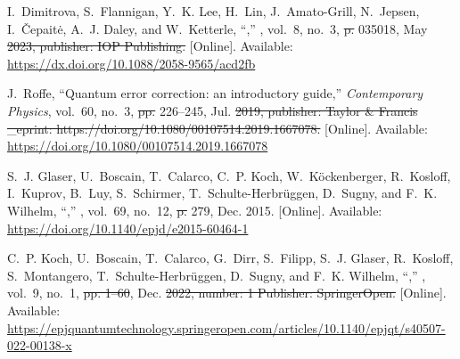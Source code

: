 \documentclass[a4paper,oneside,11pt]{book}
\providecommand{\DIFaddtex}[1]{{\protect\color{blue}\uwave{#1}}} %
\providecommand{\DIFdeltex}[1]{{\protect\color{red}\sout{#1}}}                      %
\providecommand{\DIFaddbegin}{} %
\providecommand{\DIFaddend}{} %
\providecommand{\DIFdelbegin}{} %
\providecommand{\DIFdelend}{} %
\providecommand{\DIFadd}[1]{\texorpdfstring{\DIFaddtex{#1}}{#1}} %
\providecommand{\DIFdel}[1]{\texorpdfstring{\DIFdeltex{#1}}{}} %
\newcommand{\DIFscaledelfig}{0.5}
\newlength{\DIFdelgraphicswidth} %
\newlength{\DIFdelgraphicsheight} %
\newcommand{\DIFaddincludegraphics}[2][]{{\color{blue}\fbox{\DIFOincludegraphics[#1]{#2}}}} %
\newcommand{\DIFdelincludegraphics}[2][]{%
\sbox{\DIFdelgraphicsbox}{\DIFOincludegraphics[#1]{#2}}%
\settoboxwidth{\DIFdelgraphicswidth}{\DIFdelgraphicsbox} %
\settoboxtotalheight{\DIFdelgraphicsheight}{\DIFdelgraphicsbox} %
\scalebox{\DIFscaledelfig}{%
\parbox[b]{\DIFdelgraphicswidth}{\usebox{\DIFdelgraphicsbox}\\[-\baselineskip] \rule{\DIFdelgraphicswidth}{0em}}\llap{\resizebox{\DIFdelgraphicswidth}{\DIFdelgraphicsheight}{%
\setlength{\unitlength}{\DIFdelgraphicswidth}%
\begin{picture}(1,1)%
\thicklines\linethickness{2pt} %
{\color[rgb]{1,0,0}\put(0,0){\framebox(1,1){}}}%
{\color[rgb]{1,0,0}\put(0,0){\line( 1,1){1}}}%
{\color[rgb]{1,0,0}\put(0,1){\line(1,-1){1}}}%
\end{picture}%
}\hspace*{3pt}}} %
} %
\DeclareRobustCommand{\DIFaddbegin}{\DIFOaddbegin \let\includegraphics\DIFaddincludegraphics} %
\DeclareRobustCommand{\DIFaddend}{\DIFOaddend \let\includegraphics\DIFOincludegraphics} %
\DeclareRobustCommand{\DIFdelbegin}{\DIFOdelbegin \let\includegraphics\DIFdelincludegraphics} %
\DeclareRobustCommand{\DIFdelend}{\DIFOaddend \let\includegraphics\DIFOincludegraphics} %
\begin{document}
\begin{thebibliography}{100}
\BIBentryALTinterwordspacing
I.~Dimitrova, S.~Flannigan, Y.~K. Lee, H.~Lin, J.~Amato-Grill, N.~Jepsen,
  I.~Čepaitė, A.~J. Daley, and W.~Ketterle,
  ``,''
  \emph{}, vol.~8,
  no.~3,  \DIFdelbegin \DIFdel{p. }\DIFdelend 035018, May \DIFdelbegin \DIFdel{2023, publisher: IOP Publishing. }\DIFdelend \DIFaddbegin \DIFadd{2023. }\DIFaddend [Online]. Available:
  \url{https://dx.doi.org/10.1088/2058-9565/acd2fb}
\BIBentrySTDinterwordspacing

\BIBentryALTinterwordspacing
J.~Roffe, ``Quantum error correction: an introductory guide,''
  \emph{Contemporary Physics}, vol.~60, no.~3,  \DIFdelbegin \DIFdel{pp. }\DIFdelend 226--245, Jul. \DIFdelbegin \DIFdel{2019,
  publisher: Taylor \& Francis \_eprint:
  https://doi.org/10.1080/00107514.2019.1667078. }\DIFdelend \DIFaddbegin \DIFadd{2019. }\DIFaddend [Online].
  Available: \url{https://doi.org/10.1080/00107514.2019.1667078}
\BIBentrySTDinterwordspacing

\BIBentryALTinterwordspacing
S.~J. Glaser, U.~Boscain, T.~Calarco, C.~P. Koch, W.~Köckenberger, R.~Kosloff,
  I.~Kuprov, B.~Luy, S.~Schirmer, T.~Schulte-Herbrüggen, D.~Sugny, and F.~K.
  Wilhelm, ``,'' \emph{}, vol.~69, no.~12,  \DIFdelbegin \DIFdel{p. }\DIFdelend 279, Dec. 2015. [Online]. Available:
  \url{https://doi.org/10.1140/epjd/e2015-60464-1}
\BIBentrySTDinterwordspacing

\BIBentryALTinterwordspacing
C.~P. Koch, U.~Boscain, T.~Calarco, G.~Dirr, S.~Filipp, S.~J. Glaser,
  R.~Kosloff, S.~Montangero, T.~Schulte-Herbrüggen, D.~Sugny, and F.~K.
  Wilhelm, ``,'' \emph{}, vol.~9, no.~1, \DIFdelbegin \DIFdel{pp. 1--60}\DIFdelend \DIFaddbegin \DIFadd{~19}\DIFaddend , Dec. \DIFdelbegin \DIFdel{2022, number: 1 Publisher:
  SpringerOpen. }\DIFdelend \DIFaddbegin \DIFadd{2022. }\DIFaddend [Online]. Available:
  \url{https://epjquantumtechnology.springeropen.com/articles/10.1140/epjqt/s40507-022-00138-x}
\BIBentrySTDinterwordspacing


\end{thebibliography}
\end{document}
